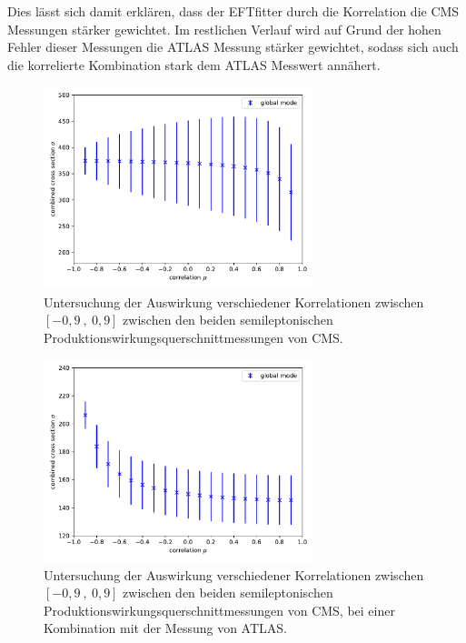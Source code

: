Dies lässt sich damit erklären, dass der EFTfitter durch die Korrelation die CMS Messungen stärker gewichtet. Im restlichen Verlauf wird auf Grund der hohen Fehler dieser Messungen die ATLAS Messung stärker gewichtet, sodass sich auch die korrelierte Kombination stark dem ATLAS Messwert annähert.\\
\begin{figure}
  \centering
  \includegraphics[width=0.7\textwidth]{Plots/corr_CMS.pdf}
  \caption{Untersuchung der Auswirkung verschiedener Korrelationen zwischen $[-0,9~,~0,9]$ zwischen den beiden semileptonischen Produktionswirkungsquerschnittmessungen von CMS.}
  \label{fig:corrcms}
\end{figure}
\begin{figure}
  \centering
  \includegraphics[width=0.7\textwidth]{Plots/fcorr_cms.pdf}
  \caption{Untersuchung der Auswirkung verschiedener Korrelationen zwischen $[-0,9~,~0,9]$ zwischen den beiden semileptonischen Produktionswirkungsquerschnittmessungen von CMS, bei einer Kombination mit der Messung von ATLAS.}
  \label{fig:corrca}
\end{figure}
